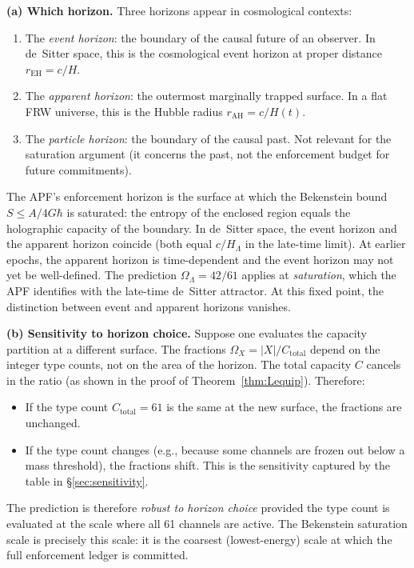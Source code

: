 \documentclass[11pt,a4paper]{article}
\theoremstyle{definition}
\begin{document}
\smallskip\noindent\textbf{(a) Which horizon.}\quad
Three horizons appear in cosmological contexts:
\begin{enumerate}[label=(\roman*),nosep]
  \item The \emph{event horizon}: the boundary of the causal future of
  an observer.  In de~Sitter space, this is the cosmological event
  horizon at proper distance $r_{\mathrm{EH}} = c/H$.
  \item The \emph{apparent horizon}: the outermost marginally trapped
  surface.  In a flat FRW universe, this is the Hubble radius
  $r_{\mathrm{AH}} = c/H(t)$.
  \item The \emph{particle horizon}: the boundary of the causal past.
  Not relevant for the saturation argument (it concerns the past, not
  the enforcement budget for future commitments).
\end{enumerate}
The APF's enforcement horizon is the surface at which the
Bekenstein bound $S \le A / 4G\hbar$ is saturated: the entropy of
the enclosed region equals the holographic capacity of the boundary.
In de~Sitter space, the event horizon and the apparent horizon
coincide (both equal $c/H_\Lambda$ in the late-time limit).  At
earlier epochs, the apparent horizon is time-dependent and the event
horizon may not yet be well-defined.  The prediction $\Omega_\Lambda =
42/61$ applies at \emph{saturation}, which the APF identifies with
the late-time de~Sitter attractor.  At this fixed point, the
distinction between event and apparent horizons vanishes.

\smallskip\noindent\textbf{(b) Sensitivity to horizon choice.}\quad
Suppose one evaluates the capacity partition at a different surface.
The fractions $\Omega_X = |X| / C_{\mathrm{total}}$ depend on the
integer type counts, not on the area of the horizon.  The total
capacity $C$ cancels in the ratio (as shown in the proof of
Theorem~\ref{thm:Lequip}).  Therefore:
\begin{itemize}[nosep]
  \item If the type count $C_{\mathrm{total}} = 61$ is the same at
  the new surface, the fractions are unchanged.
  \item If the type count changes (e.g., because some channels are
  frozen out below a mass threshold), the fractions shift.  This is
  the sensitivity captured by the table in \S\ref{sec:sensitivity}.
\end{itemize}
The prediction is therefore \emph{robust to horizon choice} provided
the type count is evaluated at the scale where all 61 channels are
active.  The Bekenstein saturation scale is precisely this scale: it
is the coarsest (lowest-energy) scale at which the full enforcement
ledger is committed.
\end{document}
